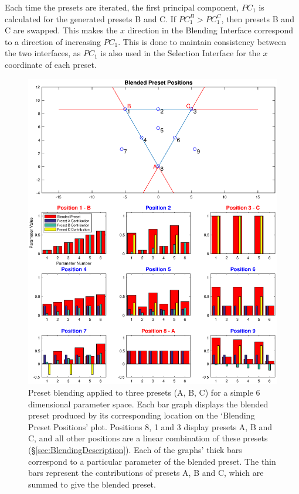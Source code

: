 \documentclass[11pt, oneside]{report}   	%
\begin{document}
Each time the presets are iterated, the first principal component, $PC_{1}$ is calculated for the generated presets B and C. If $PC_{1}^B > PC_{1}^C $, then presets B and C are swapped. This makes the $x$ direction in the Blending Interface correspond to a direction of increasing $PC_{1}$. This is done to maintain consistency between the two interfaces, as $PC_{1}$ is also used in the Selection Interface for the $x$ coordinate of each preset.\\
\begin{figure}[h!] 
	\vspace{-2cm}
	\hspace{-2.0cm}
	\includegraphics[trim = {1cm, 2.5cm, 1cm, 1cm}, clip, width = 7.5in]{BlendingExamplePlot.eps}
	\caption{Preset blending applied to three presets {\color{red}(A, B, C)} for a simple 6 dimensional parameter space. Each bar graph displays the blended preset produced by its corresponding location on the `Blending Preset Positions' plot. Positions 8, 1 and 3 display presets A, B and C, and all other positions are a linear combination of these presets (\S \ref{sec:BlendingDescription}). Each of the graphs' thick bars correspond to a particular parameter of the blended preset. The thin bars represent the contributions of presets A, B and C, which are summed to give the blended preset.}
	\label{fig:BlendingExample}
\end{figure}
\end{document}
